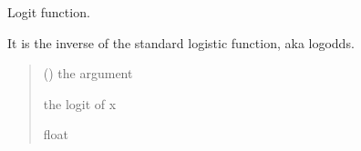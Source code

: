 \documentclass[letterpaper,10pt,english]{sphinxmanual}
\begin{document}
\begin{fulllineitems}
\label{\detokenize{cubmods:cubmods.general.logit}}
\pysigstartsignatures
{}
\pysigstopsignatures
\sphinxAtStartPar
Logit function.

\sphinxAtStartPar
It is the inverse of the
standard logistic function, aka
log\sphinxhyphen{}odds.
\begin{quote}\begin{description}
\sphinxAtStartPar
{} () \textendash{} the argument

\sphinxAtStartPar
the logit of x

\sphinxAtStartPar
float

\end{description}\end{quote}

\end{fulllineitems}

\end{document}
